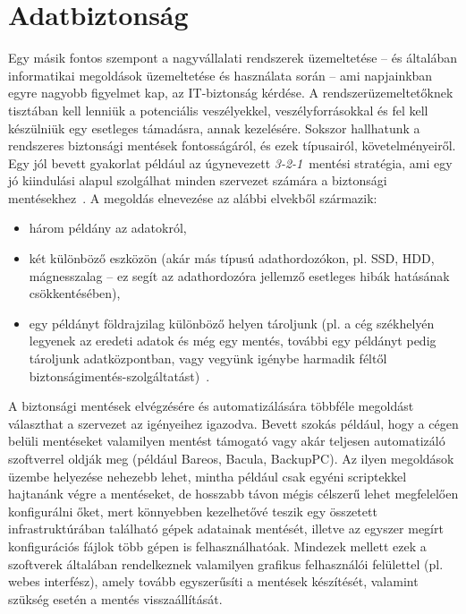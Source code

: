 \section{Adatbiztonság}
\label{sect:datasec}
Egy másik fontos szempont a nagyvállalati rendszerek üzemeltetése -- és általában informatikai megoldások üzemeltetése és használata során -- ami napjainkban egyre nagyobb figyelmet kap, az IT-biztonság kérdése. A rendszerüzemeltetőknek tisztában kell lenniük a potenciális veszélyekkel, veszélyforrásokkal és fel kell készülniük egy esetleges támadásra, annak kezelésére. Sokszor hallhatunk a rendszeres biztonsági mentések fontosságáról, és ezek típusairól, követelményeiről. Egy jól bevett gyakorlat például az úgynevezett \textit{\mbox{3-2-1}}~mentési stratégia, ami egy jó kiindulási alapul szolgálhat minden szervezet számára a biztonsági mentésekhez~\cite{Backblaze321}.
A megoldás elnevezése az alábbi elvekből származik:
\begin{itemize}
	\item három példány az adatokról,
	\item két különböző eszközön (akár más típusú adathordozókon, pl. SSD, HDD, mágnesszalag -- ez segít az adathordozóra jellemző esetleges hibák hatásának csökkentésében),
	\item egy példányt földrajzilag különböző helyen tároljunk (pl. a cég székhelyén legyenek az eredeti adatok és még egy mentés, további egy példányt pedig tároljunk adatközpontban, vagy vegyünk igénybe harmadik féltől biztonságimentés-szolgáltatást)~\cite{Seagate321}.
\end{itemize}

A biztonsági mentések elvégzésére és automatizálására többféle megoldást választhat a szervezet az igényeihez igazodva. Bevett szokás például, hogy a cégen belüli mentéseket valamilyen mentést támogató vagy akár teljesen automatizáló szoftverrel oldják meg (például Bareos, Bacula, BackupPC). Az ilyen megoldások üzembe helyezése nehezebb lehet, mintha például csak egyéni scriptekkel hajtanánk végre a mentéseket, de hosszabb távon mégis célszerű lehet megfelelően konfigurálni őket, mert könnyebben kezelhetővé teszik egy összetett infrastruktúrában található gépek adatainak mentését, illetve az egyszer megírt konfigurációs fájlok több gépen is felhasználhatóak. Mindezek mellett ezek a szoftverek általában rendelkeznek valamilyen grafikus felhasználói felülettel (pl. webes interfész), amely tovább egyszerűsíti a mentések készítését, valamint szükség esetén a mentés visszaállítását.

